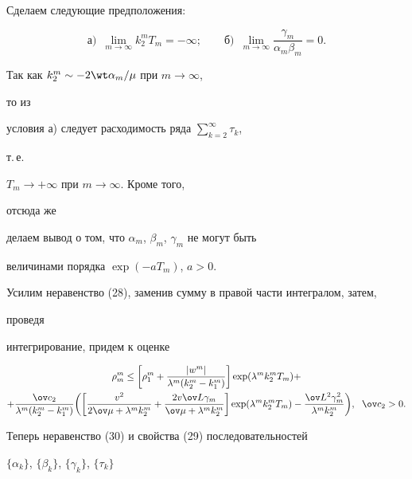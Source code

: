 Сделаем следующие предположения:


\begin{equation}\label{29}


\text{а)}\ \;\lim_{m\rightarrow \infty }k_2^mT_m=-\infty;\qquad


\text{б)}\ \;\lim_{m\rightarrow \infty }\frac{\gamma_m}{\alpha_m\beta_m}=0.


\end{equation}


Так как $k_2^m\sim -2\wt \alpha_m/\mu $ при $m\rightarrow \infty$,


то из


условия а) следует расходимость ряда $\sum\limits_{k=2}^{\infty }\tau_k$,


т.\,е.


$T_m \rightarrow +\infty$ при $m\rightarrow \infty$. Кроме того,


отсюда же


делаем вывод о том, что $\alpha_m$, $\beta_m$, $\gamma_m$ не могут быть


величинами порядка $\exp(-aT_m)$, $a>0$.





Усилим неравенство (28), заменив сумму в правой части интегралом, затем,


проведя


интегрирование, придем к оценке


\begin{multline}\label {30}


\rho_m^m\leq \bigg[\rho_1^m +\frac{|w^m|}{\lambda


^m(k_2^m-k_1^m)}\bigg]


\exp(\lambda^mk_2^mT_m)+ \\


%


+\frac{\ov c_2}{\lambda^m(k_2^m-k_1^m)}\bigg(\bigg[


\frac{v^2}{2\ov \mu +\lambda^mk_2^m}+\frac{2v\ov L\gamma_m}{\ov \mu


+\lambda^m


k_2^m}\bigg]\exp(\lambda^mk_2^mT_m)-\frac{\ov L^2\gamma^2_m}


{\lambda^mk_2^m}\bigg),\ \;\ov c_2>0.


\end{multline}


Теперь неравенство (30) и свойства (29) последовательностей


$\{\alpha_k\}$, $\{\beta_k\}$, $\{\gamma_k\}$, $\{\tau_k\}$


